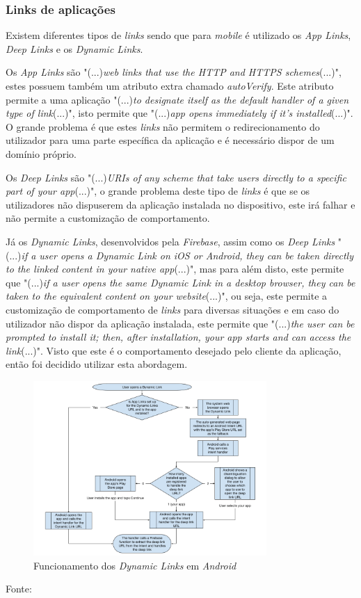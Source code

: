 \subsubsection{Links de aplicações}

Existem diferentes tipos de \textit{links} sendo que para \textit{mobile} é utilizado os \textit{App Links}, \textit{Deep Links} e os \textit{Dynamic Links}.

Os \emph{App Links} são "(...)\emph{web links that use the HTTP and HTTPS schemes}(...)"\citep{linking}, estes possuem também um atributo extra chamado \textit{autoVerify}. Este atributo permite a uma aplicação "(...)\emph{to designate itself as the default handler of a given type of link}(...)"\citep{linking}, isto permite que "(...)\emph{app opens immediately if it's installed}(...)"\citep{linking}. O grande problema é que estes \textit{links} não permitem o redirecionamento do utilizador para uma parte específica da aplicação e é necessário dispor de um domínio próprio.


Os \textit{Deep Links} são "(...)\emph{URIs of any scheme that take users directly to a specific part of your app}(...)"\citep{linking}, o grande problema deste tipo de \textit{links} é que se os utilizadores não dispuserem da aplicação instalada no dispositivo, este irá falhar e não permite a customização de comportamento.

Já os \textit{Dynamic Links}, desenvolvidos pela \textit{Firebase}, assim como os \textit{Deep Links} "(...)\emph{if a user opens a Dynamic Link on iOS or Android, they can be taken directly to the linked content in your native app}(...)"\citep{dynamic_linking}, mas para além disto, este permite que "(...)\emph{if a user opens the same Dynamic Link in a desktop browser, they can be taken to the equivalent content on your website}(...)"\citep{dynamic_linking}, ou seja, este permite a customização de comportamento de \textit{links} para diversas situações e em caso do utilizador não dispor da aplicação instalada, este permite que "(...)\emph{the user can be prompted to install it; then, after installation, your app starts and can access the link}(...)"\citep{dynamic_linking}. Visto que este é o comportamento desejado pelo cliente da aplicação, então foi decidido utilizar esta abordagem.

\begin{figure}[htb]
  \centering
  \includegraphics[width=0.79\textwidth]{images/diagramas/fdl-android-integration.png}
  \caption{Funcionamento dos \textit{Dynamic Links} em \textit{Android} }
  \label{fig:23}
\end{figure}
Fonte: \citep{linking_firebase}
